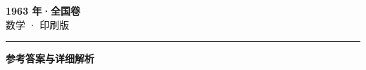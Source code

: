 \documentclass[zihao=5, a4paper]{ctexart}
\begin{document}
\begin{center}
  {\Large\bfseries 1963 年·全国卷}\\[4pt]
  {\large 数学 · 印刷版}
\end{center}
\medskip
{}

\par\bigskip\hrule\bigskip
{}
\begin{center}{\large\bfseries 参考答案与详细解析}\end{center}
\smallskip

\end{document}
